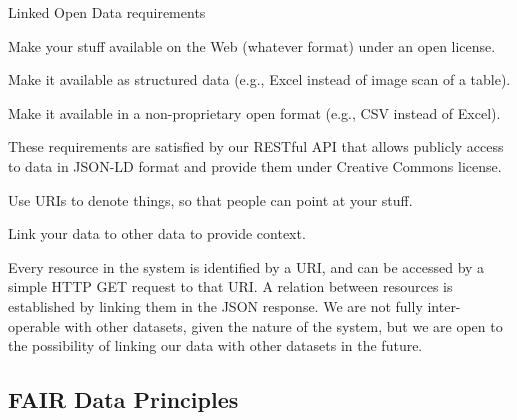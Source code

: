 \begin{frame}[allowframebreaks]{Linked Open Data\autocite{Berners-Lee_2006} requirements}
	\begin{block}{\faStar\faStarO\faStarO\faStarO\faStarO}
		Make your stuff available on the Web (whatever format) under an open
		license.
	\end{block}
	\vspace*{-8pt}
	\begin{block}{\faStar\faStar\faStarO\faStarO\faStarO}
		Make it available as structured data (e.g., Excel instead of image scan
		of a table).
	\end{block}
	\vspace*{-8pt}
	\begin{block}{\faStar\faStar\faStar\faStarO\faStarO}
		Make it available in a non-proprietary open format (e.g., CSV instead of
		Excel).
	\end{block}
	These requirements are satisfied by our RESTful API that allows
	publicly access to data in JSON-LD\autocite{Sporny_2014} format and provide
	them under Creative Commons license.

	\framebreak

	\begin{block}{\faStar\faStar\faStar\faStar\faStarO}
		Use URIs to denote things, so that people can point at your stuff.
	\end{block}
	\vspace*{-8pt}
	\begin{block}{\faStar\faStar\faStar\faStar\faStar}
		Link your data to \textcolor{UNITSCherry}{other} data to provide context.
	\end{block}
	Every resource in the system is identified by a URI, and can be accessed
	by a simple HTTP GET request to that URI. A relation between resources
	is established by linking them in the JSON response.
	We are not fully inter-operable with other datasets, given the nature of the
	system, but we are open to the possibility of linking our data with
	other datasets in the future.
\end{frame}

\subsection{FAIR Data Principles}

